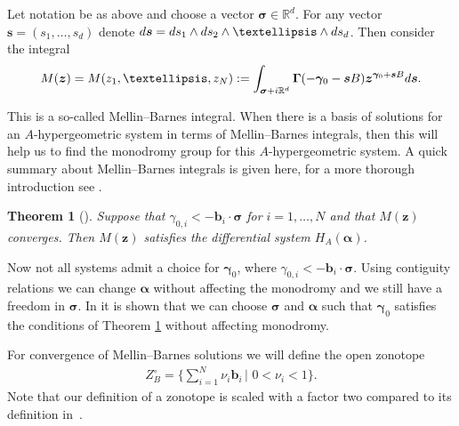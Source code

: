 \documentclass[11pt]{article}
\numberwithin{equation}{section}
\numberwithin{equation}{section}
\newtheorem{Theorem}{Theorem}[section]
\begin{document}
Let notation be as above and choose a vector $\bm{\sigma} \in \mathbb{R}^d$. For any vector $\bm{s} = (s_1,\dots,s_d)$ denote ${\rm d} \bm{s}= {\rm d} s_1 \wedge {\rm d} s_2 \wedge \dots \wedge {\rm d} s_d$. Then consider the integral
\begin{gather*}
M(\bm{z}) = M(z_1,\dots,z_N) := \int_{\bm{\sigma} + i\mathbb{R}^d} \bm{\Gamma}(-\bm{\gamma}_0-\bm{s}B)\bm{z}^{\bm{\gamma}_0 + \bm{s}B} {\rm d} \bm{s}.
\end{gather*}

This is a so-called Mellin--Barnes integral. When there is a basis of solutions
for an $A$-hypergeometric system in terms of Mellin--Barnes integrals, then this will help us to find the monodromy group for this $A$-hypergeometric system. A quick summary about Mellin--Barnes integrals is given here, for a more thorough introduction see \cite{Beu13}.


\begin{Theorem}[{\cite[Theorem 3.1]{Beu13}}]\label{thm-MB-gamma}%
Suppose that $\gamma_{0,i} < - \bm{b}_i \cdot \bm{\sigma}$ for
$i = 1,\dots,N$ and that $M(\bm{z})$ converges. Then $M(\bm{z})$ satisfies the differential system $H_{A}(\bm{\alpha})$.
\end{Theorem}
Now not all systems admit a choice for $\bm{\gamma}_0$, where $\gamma_{0,i} < - \bm{b}_i \cdot \bm{\sigma}$. Using contiguity relations we can change $\bm{\alpha}$ without affecting the monodromy and we still have a freedom in $\bm{\sigma}$.
In \cite{Beu13} it is shown that we can choose $\bm{\sigma}$ and $\bm{\alpha}$ such that $\bm{\gamma}_0$ satisfies the conditions of Theorem \ref{thm-MB-gamma} without affecting monodromy.

For convergence of Mellin--Barnes solutions we will define the open zonotope
\begin{gather*}
Z_B^{\circ} = \Bigg\{\sum_{i=1}^N \nu_i \bm{b}_i\,\bigg|\,\, 0 < \nu_i < 1\bigg\}.
\end{gather*}
Note that our definition of a zonotope is scaled with a factor two compared to its definition in~{\rm \cite{Beu13}}.
\end{document}
